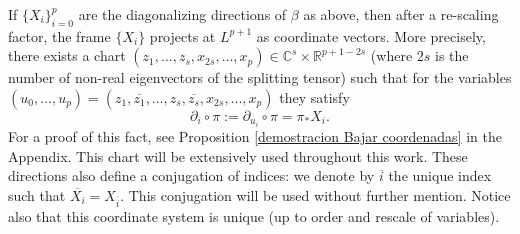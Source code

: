 \documentclass{article}
\theoremstyle{remark}
\begin{document}
If $\{X_i\}_{i=0}^p$ are the diagonalizing directions of $\beta$ as above, then after a re-scaling factor, the frame $\{X_i\}$ projects at $L^{p+1}$ as coordinate vectors. More precisely, there exists a chart $(z_1,\ldots,z_s,x_{2s},\ldots, x_p)\in\mathbb{C}^{s}\times\mathbb{R}^{p+1-2s}$ (where $2s$ is the number of non-real eigenvectors of the splitting tensor) such that for the variables $(u_0,\ldots,u_p)=(z_1,\overline{z_1},\ldots, z_s,\overline{z_s},x_{2s},\ldots,x_{p})$ they satisfy
\begin{equation}\label{Bajar coordenadas}
    \partial_i\circ\pi:=\partial_{u_i}\circ\pi=\pi_{*}X_i.
\end{equation}
For a proof of this fact, see Proposition \ref{demostracion Bajar coordenadas} in the Appendix. This chart will be extensively used throughout this work.
These directions also define a conjugation of indices: we denote by $\overline{i}$ the unique index such that $\overline{X_i}=X_{\overline{i}}$. This conjugation will be used without further mention.
Notice also that this coordinate system is unique (up to order and rescale of variables).
\end{document}
